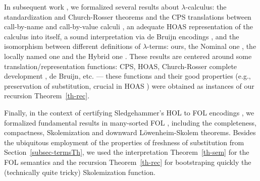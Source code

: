 In subsequent %
work \cite{pop-recPrin}, we formalized several results about 
$\lambda$-calculus: 
the standardization and Church-Rosser theorems 
and the %
CPS translations between 
call-by-name and call-by-value calculi 
\cite{plotkin-CBNandCBVandLambda},  
an adequate HOAS representation of the calculus into itself, 
a sound interpretation via de Bruijn encodings \cite{cur-CategoricalCombinators}, and 
the isomorphism between different definitions of $\lambda$-terms: 
ours, the Nominal one \cite{UrbanTasson}, the 
locally named one \cite{pol-LocNamed2} and the Hybrid one \cite{momFelty-Hybrid4}. %
These results are centered 
around some translation/representation functions: CPS, HOAS, 
Church-Rosser complete development \cite{takahashi-CompleteDevelopment}, 
de Bruijn, etc.%
---%
these functions 
and their 
good properties (e.g., preservation of substitution, 
crucial in HOAS \cite{har-fra}) 
were obtained as 
instances of our recursion Theorem~\ref{th-rec}.   

Finally, in the context of certifying Sledgehammer's HOL to FOL encodings \cite{DBLP:journals/corr/BlanchetteB0S16}, 
we formalized fundamental results in many-sorted FOL \cite{blanchette-frocos2013}, 
including the completeness, compactness, 
Skolemization and downward L\"{o}wenheim-Skolem theorems. Besides the ubiquitous 
employment of the properties of freshness of substitution from Section~\ref{subsec-termsTh}, 
we 
used the interpretation Theorem~\ref{th-sem} for the FOL semantics 
and the recursion Theorem~\ref{th-rec} for bootstraping quickly the (technically quite tricky) Skolemization 
function.  







 
  







